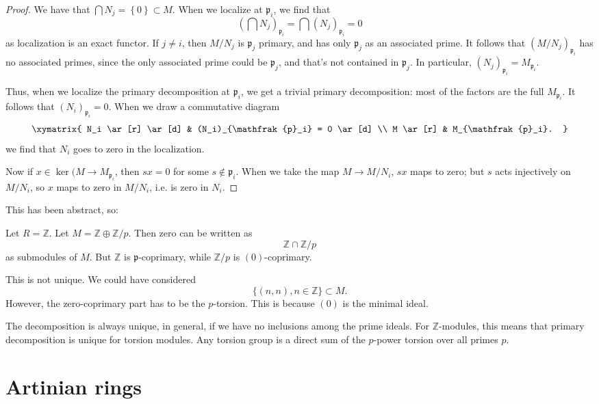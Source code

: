 \begin{proof} 
We have that $\bigcap N_j = \left\{0\right\} \subset M$. When we localize at
$\mathfrak{p}_i$, we find that
\[ (\bigcap N_j)_{\mathfrak{p}_i} = \bigcap (N_j)_{\mathfrak{p}_i} =0 \]
as localization is an exact functor. If $j \neq i$, then $M/N_j$ is
$\mathfrak{p}_j$ primary, and has only $\mathfrak{p}_j$ as an associated prime.
It follows that $(M/N_j)_{\mathfrak{p}_i}$ has no associated primes, since the
only associated prime could be $\mathfrak{p}_j$, and that's not contained in
$\mathfrak{p}_j$.
In particular, $(N_j)_{\mathfrak{p}_i} = M_{\mathfrak{p}_i}$.

Thus, when we localize the primary decomposition at $\mathfrak{p}_i$, we get
a trivial primary decomposition: most of the factors are the full
$M_{\mathfrak{p}_i}$.  It follows that $(N_i)_{\mathfrak{p}_i}=0$. When we draw
a commutative diagram
\[ 
\xymatrix{
N_i \ar[r] \ar[d]  &  (N_i)_{\mathfrak{p}_i} = 0 \ar[d]  \\
M \ar[r] &  M_{\mathfrak{p}_i}.
}
\]
we find that $N_i$ goes to zero in the localization.

Now if $x \in \ker(M \to M_{\mathfrak{p}_i}$, then $sx = 0$ for some $s \notin
\mathfrak{p}_i$. When we take the map $M \to M/N_i$, $sx$ maps to zero; but $s$
acts injectively on $M/N_i$, so $x$ maps to zero in $M/N_i$, i.e. is zero in
$N_i$.
\end{proof} 

This has been abstract, so:
\begin{example} Let $ R = \mathbb{Z}$.
Let $M = \mathbb{Z} \oplus \mathbb{Z}/p$. Then zero can be written as 
\[ \mathbb{Z} \cap \mathbb{Z}/p  \]
as submodules of $M$. But $\mathbb{Z}$ is $\mathfrak{p}$-coprimary, while
$\mathbb{Z}/p$ is $(0)$-coprimary. 

This is not unique. We could have considered 
\[ \{(n,n), n \in \mathbb{Z}\} \subset M.  \]
However, the zero-coprimary part has to be the $p$-torsion. This is because
$(0)$ is the minimal ideal. 

The decomposition is always unique, in general, if
we have no inclusions among the prime ideals. For $\mathbb{Z}$-modules, this
means that primary decomposition is unique for torsion modules. 
Any torsion group is a direct sum of the $p$-power torsion over all primes $p$. 
\end{example} 


\section{Artinian rings}



